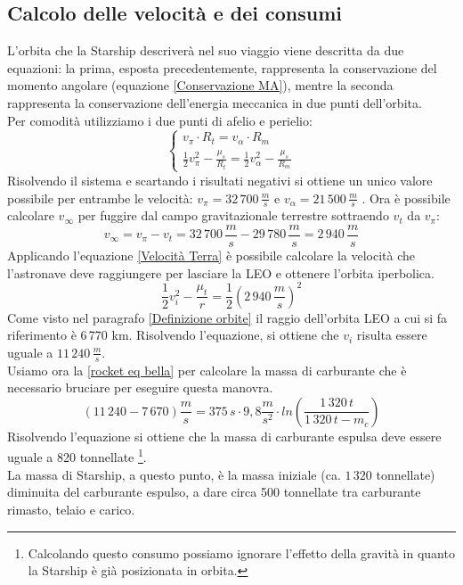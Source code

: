 \subsection{Calcolo delle velocità e dei consumi}
L'orbita che la Starship descriverà nel suo viaggio viene descritta da due equazioni: la prima, esposta precedentemente, rappresenta la conservazione del momento angolare (equazione \ref{Conservazione MA}), mentre la seconda rappresenta la conservazione dell'energia meccanica in due punti dell'orbita.\\
Per comodità utilizziamo i due punti di afelio e perielio:
\begin{equation}
    \begin{cases}
        v_\pi \cdot R_t = v_\alpha \cdot R_m\\
        \frac{1}{2}v_\pi^2 - \frac{\mu_s}{R_t} = \frac{1}{2}v_\alpha^2 - \frac{\mu_s}{R_m}
    \end{cases}
\end{equation}
Risolvendo il sistema e scartando i risultati negativi si ottiene un unico valore possibile per entrambe le velocità: $v_\pi = 32\,700\,\frac{m}{s}$ e $v_\alpha = 21\,500
\,\frac{m}{s}$ . Ora è possibile calcolare $v_\infty$ per fuggire dal campo gravitazionale terrestre sottraendo $v_t$ da $v_\pi$:
$$
v_\infty = v_\pi - v_t = 32\,700\, \frac{m}{s} - 29\,780\, \frac{m}{s} = 2\,940\,\frac{m}{s}
$$
Applicando l'equazione \ref{Velocità Terra} è possibile calcolare la velocità che l'astronave deve raggiungere per lasciare la LEO e ottenere l'orbita iperbolica.
$$
\frac{1}{2}v_i^2 - \frac{\mu_t}{r} = \frac{1}{2}\left(2\,940\,\frac{m}{s}\right)^2
$$
Come visto nel paragrafo \ref{Definizione orbite} il raggio dell'orbita LEO a cui si fa riferimento è 6\,770 km.
Risolvendo l'equazione, si ottiene che $v_i$ risulta essere uguale a $11\,240\,\frac{m}{s}$.\\
Usiamo ora la \ref{rocket eq bella} per calcolare la massa di carburante che è necessario bruciare per eseguire questa manovra.
$$
(11\,240-7\,670)\frac{m}{s} = 375\,s\cdot9,8\frac{m}{s^2}\cdot ln\left(\frac{1\,320\,t}{1\,320\,t - m_c}\right)
$$
Risolvendo l'equazione si ottiene che la massa di carburante espulsa deve essere uguale a 820 tonnellate \footnote{Calcolando questo consumo possiamo ignorare l'effetto della gravità in quanto la Starship è già posizionata in orbita.}.\\
La massa di Starship, a questo punto, è la massa iniziale (ca. $1\,320$ tonnellate) diminuita del carburante espulso, a dare circa 500 tonnellate tra carburante rimasto, telaio e carico.\\
